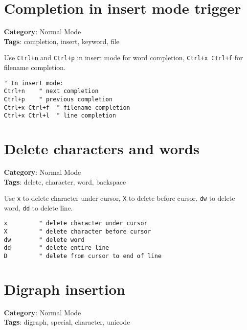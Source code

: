 {{{{{{{{{{\section{Completion in insert mode trigger}

\textbf{Category}: Normal Mode\\ \textbf{Tags}: completion, insert, keyword, file
\vspace{0.5cm}

Use {\footnotesize \Verb§Ctrl+n§} and {\footnotesize \Verb§Ctrl+p§} in insert mode for word completion, {\footnotesize \Verb§Ctrl+x Ctrl+f§} for filename completion.

\begin{Exa*}{}
\begin{Verbatim}[fontsize=\footnotesize, breaklines, breakanywhere]
" In insert mode:
Ctrl+n    " next completion
Ctrl+p    " previous completion
Ctrl+x Ctrl+f  " filename completion
Ctrl+x Ctrl+l  " line completion
\end{Verbatim}
\end{Exa*}

\section{Delete characters and words}

\textbf{Category}: Normal Mode\\ \textbf{Tags}: delete, character, word, backspace
\vspace{0.5cm}

Use {\footnotesize \Verb§x§} to delete character under cursor, {\footnotesize \Verb§X§} to delete before cursor, {\footnotesize \Verb§dw§} to delete word, {\footnotesize \Verb§dd§} to delete line.

\begin{Exa*}{}
\begin{Verbatim}[fontsize=\footnotesize, breaklines, breakanywhere]
x         " delete character under cursor
X         " delete character before cursor
dw        " delete word
dd        " delete entire line
D         " delete from cursor to end of line
\end{Verbatim}
\end{Exa*}

\section{Digraph insertion}

\textbf{Category}: Normal Mode\\ \textbf{Tags}: digraph, special, character, unicode
\vspace{0.5cm}

}}}}}}}}}}
